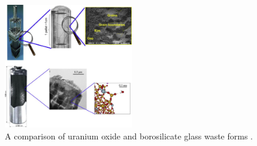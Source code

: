 \begin{figure}[htbp!]
  \begin{center}
    \includegraphics[width=0.5\textwidth]{./images/waste_forms_poinssot.eps}
  \end{center}
  \caption{A comparison of uranium oxide and borosilicate glass waste forms 
  \cite{poinssot_long-term_2012}.}
  \label{fig:waste_forms_poinssot}
\end{figure}
